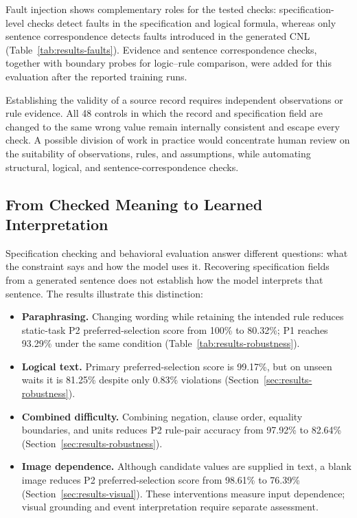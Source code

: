 Fault injection shows complementary roles for the tested checks:
specification-level checks detect faults in the specification and logical
formula, whereas only sentence correspondence detects faults introduced in the
generated CNL (Table~\ref{tab:results-faults}). Evidence and sentence
correspondence checks, together with boundary probes for logic--rule comparison,
were added for this evaluation after the reported training runs.

Establishing the validity of a source record requires independent observations
or rule evidence. All 48 controls in which the record and specification field
are changed to the same wrong value remain internally consistent and escape
every check. A possible division of work in practice would concentrate human
review on the suitability of observations, rules, and assumptions, while
automating structural, logical, and sentence-correspondence checks.

\subsection{From Checked Meaning to Learned Interpretation}\label{sec:discussion-interpretation}

Specification checking and behavioral evaluation answer different questions:
what the constraint says and how the model uses it. Recovering
specification fields from a generated sentence does not establish how the
model interprets that sentence. The results illustrate this distinction:
\begin{itemize}
\item \textbf{Paraphrasing.} Changing wording while retaining the intended
rule reduces static-task P2 preferred-selection score from 100\% to 80.32\%; P1 reaches
93.29\% under the same condition (Table~\ref{tab:results-robustness}).
\item \textbf{Logical text.} Primary preferred-selection score is 99.17\%, but on unseen waits
it is 81.25\% despite only 0.83\% violations
(Section~\ref{sec:results-robustness}).
\item \textbf{Combined difficulty.} Combining negation, clause order,
equality boundaries, and units reduces P2 rule-pair accuracy from 97.92\%
to 82.64\% (Section~\ref{sec:results-robustness}).
\item \textbf{Image dependence.} Although candidate values are supplied in
text, a blank image reduces P2 preferred-selection score from 98.61\% to 76.39\%
(Section~\ref{sec:results-visual}). These interventions measure input dependence; visual grounding and event
interpretation require separate assessment.
\end{itemize}

